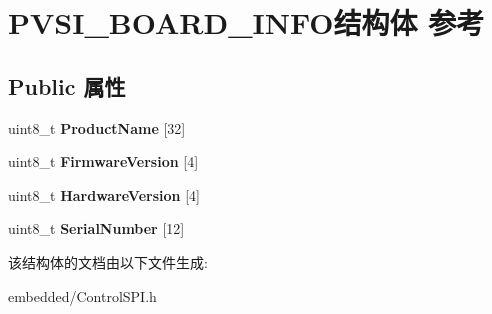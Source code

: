 \hypertarget{structVSI__BOARD__INFO}{}\section{P\+V\+S\+I\+\_\+\+B\+O\+A\+R\+D\+\_\+\+I\+N\+F\+O结构体 参考}
\label{structVSI__BOARD__INFO}
\subsection*{Public 属性}
\begin{DoxyCompactItemize}
\item 
\mbox{\label{structVSI__BOARD__INFO_ac5d4a18602ccae34e8db465ab108a64e}} 
uint8\+\_\+t {\bfseries Product\+Name} \mbox{[}32\mbox{]}
\item 
\mbox{\label{structVSI__BOARD__INFO_a44e4171046656aeff4f2c5fdf69d24dc}} 
uint8\+\_\+t {\bfseries Firmware\+Version} \mbox{[}4\mbox{]}
\item 
\mbox{\label{structVSI__BOARD__INFO_a7b52c73b840fea2d5b94c47fe0c943b6}} 
uint8\+\_\+t {\bfseries Hardware\+Version} \mbox{[}4\mbox{]}
\item 
\mbox{\label{structVSI__BOARD__INFO_a146d66d6533f64ab7b75ee772eca64fc}} 
uint8\+\_\+t {\bfseries Serial\+Number} \mbox{[}12\mbox{]}
\end{DoxyCompactItemize}


该结构体的文档由以下文件生成\+:\begin{DoxyCompactItemize}
\item 
embedded/Control\+S\+P\+I.\+h\end{DoxyCompactItemize}
